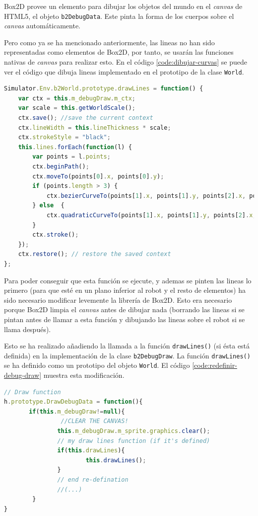 Box2D provee un elemento para dibujar los objetos del mundo en el \emph{canvas} de HTML5, el objeto \texttt{b2DebugData}. Este pinta la forma de los cuerpos sobre el \emph{canvas} automáticamente. 

Pero como ya se ha mencionado anteriormente, las lineas no han sido representadas como elementos de Box2D, por tanto, se usarán las funciones nativas de \emph{canvas} para realizar esto. En el código \ref{code:dibujar-curvas} se puede ver el código que dibuja lineas implementado en el prototipo de la clase \texttt{World}.

\begin{lstlisting}[language={Javascript},label={code:dibujar-curvas}, caption={Función que dibuja las curvas de bezier en el \emph{canvas}.}]
Simulator.Env.b2World.prototype.drawLines = function() {
	var ctx = this.m_debugDraw.m_ctx;
	var scale = this.getWorldScale();
	ctx.save(); //save the current context
	ctx.lineWidth = this.lineThickness * scale;
	ctx.strokeStyle = "black";
	this.lines.forEach(function(l) {
		var points = l.points;
		ctx.beginPath();
		ctx.moveTo(points[0].x, points[0].y);
		if (points.length > 3) {
			ctx.bezierCurveTo(points[1].x, points[1].y, points[2].x, points[2].y, points[3].x, points[3].y);
		} else  {
			ctx.quadraticCurveTo(points[1].x, points[1].y, points[2].x, points[2].y);
		}
		ctx.stroke();
	});
	ctx.restore(); // restore the saved context
};
\end{lstlisting}

Para poder conseguir que esta función se ejecute, y ademas se pinten las lineas lo primero (para que esté en un plano inferior al robot y el resto de elementos) ha sido necesario modificar levemente la librería de Box2D. Esto era necesario porque Box2D limpia el \emph{canvas} antes de dibujar nada (borrando las lineas si se pintan antes de llamar a esta función y dibujando las lineas sobre el robot si se llama después). 

Esto se ha realizado añadiendo la llamada a la función \texttt{drawLines()} (si ésta está definida) en la implementación de la clase \texttt{b2DebugDraw}. La función \texttt{drawLines()} se ha definido como un prototipo del objeto \texttt{World}. El código \ref{code:redefinir-debug-draw} muestra esta modificación.

\begin{lstlisting}[language={Javascript},label={code:redefinir-debug-draw}, caption={Modificación de la librería de Box2D para poder dibujar de manera correcta las lineas.}]
// Draw function 
h.prototype.DrawDebugData = function(){ 
	   if(this.m_debugDraw!=null){
	   			//CLEAR THE CANVAS!
			   this.m_debugDraw.m_sprite.graphics.clear(); 
			   // my draw lines function (if it's defined)
			   if(this.drawLines){
					   this.drawLines();
			   }
			   // end re-defination
			   //(...)
		}
}
\end{lstlisting}

